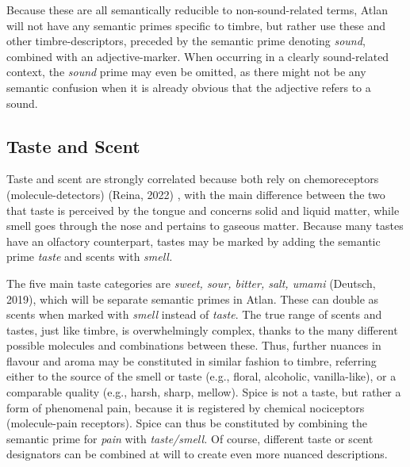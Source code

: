 Because these are all semantically reducible to non-sound-related terms, Atlan will not have any semantic primes specific to timbre, but rather use these and other timbre-descriptors, preceded by the semantic prime denoting \textit{sound}, combined with an adjective-marker. When occurring in a clearly sound-related context, the \textit{sound} prime may even be omitted, as there might not be any semantic confusion when it is already obvious that the adjective refers to a sound. 


\subsection{Taste and Scent}

\noindent Taste and scent are strongly correlated because both rely on chemoreceptors (molecule-detectors) (Reina, 2022) , with the main difference between the two that taste is perceived by the tongue and concerns solid and liquid matter, while smell goes through the nose and pertains to gaseous matter. Because many tastes have an olfactory counterpart, tastes may be marked by adding the semantic prime \textit{taste} and scents with \textit{smell.} 

The five main taste categories are \textit{sweet, sour, bitter, salt, umami}  (Deutsch, 2019), which will be separate semantic primes in Atlan. These can double as scents when marked with \textit{smell} instead of \textit{taste}. The true range of scents and tastes, just like timbre, is overwhelmingly complex, thanks to the many different possible molecules and combinations between these. Thus, further nuances in flavour and aroma may be constituted in similar fashion to timbre, referring either to the source of the smell or taste (e.g., floral, alcoholic, vanilla-like), or a comparable quality (e.g., harsh, sharp, mellow). Spice is not a taste, but rather a form of phenomenal pain, because it is registered by chemical nociceptors (molecule-pain receptors). Spice can thus be constituted by combining the semantic prime for \textit{pain} with \textit{taste/smell.} Of course, different taste or scent designators can be combined at will to create even more nuanced descriptions. 

